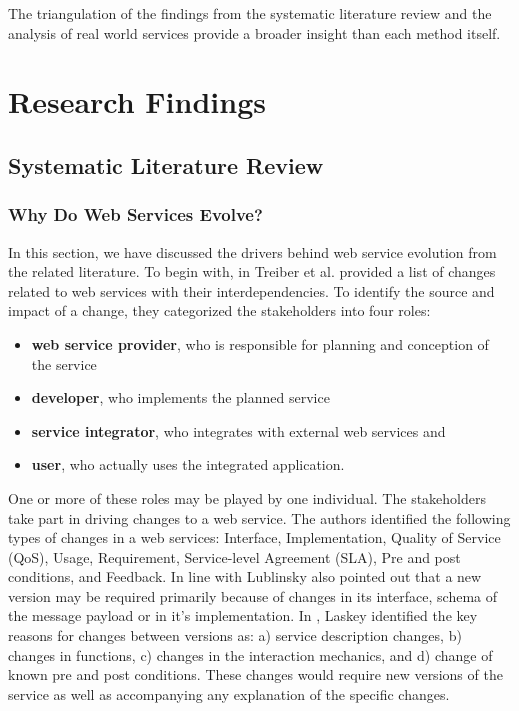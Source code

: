 \documentclass[runningheads,a4paper]{llncs}
\begin{document}
The triangulation of the findings from the systematic literature review and the analysis of real world services provide a broader insight than each method itself.



\section{Research Findings} %
\label{sec:research_findings}

\subsection{Systematic Literature Review} %
\label{sub:literature_review}

\subsubsection{Why Do Web Services Evolve?} %
\label{sub:why_do_web_services_change}
In this section, we have discussed the drivers behind web service evolution from the related literature. To begin with, in \cite{treiber2009analyzing} Treiber et al. provided a list of changes related to web services with their interdependencies. To identify the source and impact of a change, they categorized the stakeholders into four roles:

\begin{itemize}
  \item \textbf{web service provider}, who is responsible for planning and conception of the service
  \item \textbf{developer}, who implements the planned service
  \item \textbf{service integrator}, who integrates with external web services and
  \item \textbf{user}, who actually uses the integrated application.
\end{itemize}

One or more of these roles may be played by one individual. The stakeholders take part in driving changes to a web service. The authors identified the following types of changes in a web services: Interface, Implementation, Quality of Service (QoS), Usage, Requirement, Service-level Agreement (SLA), Pre and post conditions, and Feedback. In line with \cite{treiber2009analyzing}  Lublinsky also pointed out that a new version may be required primarily because of changes in its interface, schema of the message payload or in it’s implementation. In \cite{laskey2008considerations}, Laskey identified the key reasons for changes between versions as: a) service description changes, b) changes in functions, c) changes in the interaction mechanics, and d) change of known pre and post conditions. These changes would require new versions of the service as well as accompanying any explanation of the specific changes.
\end{document}

